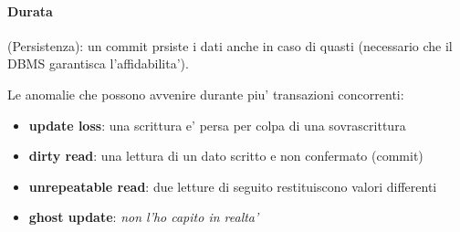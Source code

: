 \paragraph{Durata} (Persistenza): un commit prsiste i dati anche in caso di quasti (necessario che il DBMS garantisca l'affidabilita').

Le anomalie che possono avvenire durante piu' transazioni concorrenti:

\begin{itemize}
  \item \textbf{update loss}: una scrittura e' persa per colpa di una sovrascrittura
  \item \textbf{dirty read}: una lettura di un dato scritto e non confermato (commit)
  \item \textbf{unrepeatable read}: due letture di seguito restituiscono valori differenti
  \item \textbf{ghost update}: \textit{non l'ho capito in realta'}
\end{itemize}


